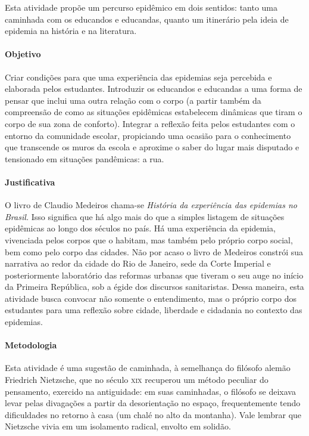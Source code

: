 \documentclass[12pt]{extarticle}
\begin{document}
Esta atividade propõe um percurso epidêmico em dois sentidos: tanto uma
caminhada com os educandos e educandas, quanto um itinerário pela ideia
de epidemia na história e na literatura.

\paragraph{Objetivo}

Criar condições para que uma experiência das epidemias seja percebida e
elaborada pelos estudantes. Introduzir os educandos e educandas a uma
forma de pensar que inclui uma outra relação com o corpo (a partir
também da compreensão de como as situações epidêmicas estabelecem
dinâmicas que tiram o corpo de sua zona de conforto). Integrar a
reflexão feita pelos estudantes com o entorno da comunidade escolar,
propiciando uma ocasião para o conhecimento que transcende os muros da
escola e aproxime o saber do lugar mais disputado e tensionado em
situações pandêmicas: a rua.

\paragraph{Justificativa}

O livro de Claudio Medeiros chama-se \emph{História da experiência das
epidemias no Brasil.} Isso significa que há algo mais do que a simples
listagem de situações epidêmicas ao longo dos séculos no país. Há uma
experiência da epidemia, vivenciada pelos corpos que o habitam, mas
também pelo próprio corpo social, bem como pelo corpo das cidades. Não
por acaso o livro de Medeiros constrói sua narrativa ao redor da cidade
do Rio de Janeiro, sede da Corte Imperial e posteriormente laboratório
das reformas urbanas que tiveram o seu auge no início da Primeira
República, sob a égide dos discursos sanitaristas. Dessa maneira, esta
atividade busca convocar não somente o entendimento, mas o próprio corpo
dos estudantes para uma reflexão sobre cidade, liberdade e cidadania no
contexto das epidemias.

\paragraph{Metodologia}

Esta atividade é uma sugestão de caminhada, à semelhança do filósofo
alemão Friedrich Nietzsche, que no século \textsc{xix} recuperou um método
peculiar do pensamento, exercido na antiguidade: em suas caminhadas, o
filósofo se deixava levar pelas divagações a partir da desorientação no
espaço, frequentemente tendo dificuldades no retorno à casa (um chalé no
alto da montanha). Vale lembrar que Nietzsche vivia em um isolamento
radical, envolto em solidão.
\end{document}
